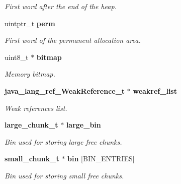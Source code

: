 \begin{DoxyCompactItemize}
\begin{DoxyCompactList}\small\item\em First word after the end of the heap. \item\end{DoxyCompactList}\item 
uintptr\_\-t {\bf perm}\label{structheap__t_a07c8a695bc8159582234dc75eeeda84d}

\begin{DoxyCompactList}\small\item\em First word of the permanent allocation area. \item\end{DoxyCompactList}\item 
uint8\_\-t $\ast$ {\bf bitmap}\label{structheap__t_a09d90167f1e0275c529bf49906c37e19}

\begin{DoxyCompactList}\small\item\em Memory bitmap. \item\end{DoxyCompactList}\item 
{\bf java\_\-lang\_\-ref\_\-WeakReference\_\-t} $\ast$ {\bf weakref\_\-list}\label{structheap__t_a8af61a6703a2fe903d95713c3e6755fe}

\begin{DoxyCompactList}\small\item\em Weak references list. \item\end{DoxyCompactList}\item 
{\bf large\_\-chunk\_\-t} $\ast$ {\bf large\_\-bin}\label{structheap__t_a3fde1410b171dbd0940268e7446d1e70}

\begin{DoxyCompactList}\small\item\em Bin used for storing large free chunks. \item\end{DoxyCompactList}\item 
{\bf small\_\-chunk\_\-t} $\ast$ {\bf bin} [BIN\_\-ENTRIES]\label{structheap__t_a433c6952a98e3fdb805e8f01fdbd1168}

\begin{DoxyCompactList}\small\item\em Bin used for storing small free chunks. \item\end{DoxyCompactList}\end{DoxyCompactItemize}


